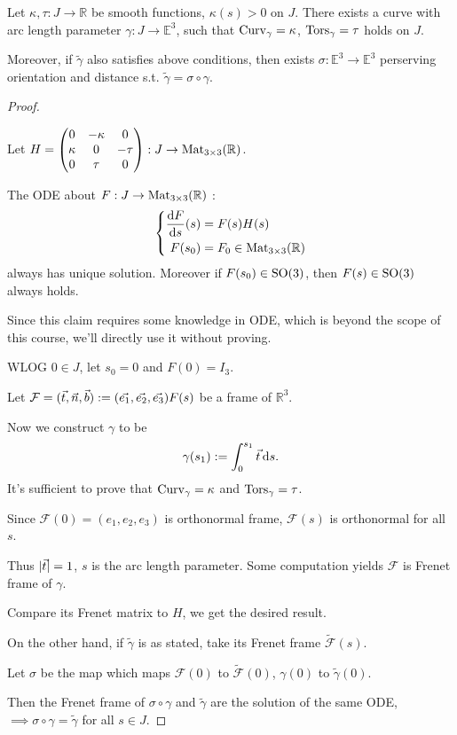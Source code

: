 \begin{theorem}
    Let $\kappa,\tau : J\to \mathbb{R}$ be smooth functions, $\kappa(s)>0$ on $J$.
	There exists a curve with arc length parameter $\gamma: J\to \mathbb{E}^3$,
	such that $\operatorname{Curv}_\gamma = \kappa$, $\operatorname{Tors}_\gamma = \tau$ holds
	on $J$.

	Moreover, if $\tilde \gamma$ also satisfies above conditions,
	then exists $\sigma: \mathbb{E}^3\to \mathbb{E}^3$ perserving orientation and
	distance s.t.  $\tilde\gamma = \sigma\circ\gamma$.
\end{theorem}
\begin{proof}[Proof]
    \begin{claim}
        Let $H = \begin{pmatrix}
			0&-\kappa&0\\\kappa&0&-\tau\\0&\tau&0
        \end{pmatrix}
        : J\to \mathrm{Mat}_{3 \times 3}(\mathbb{R})$.

		The ODE about $F: J\to \mathrm{Mat}_{3 \times 3}(\mathbb{R})$ :
		\[
		\left\{\begin{aligned}
				\frac{\mathop{}\!\mathrm{d} F}{\mathop{}\!\mathrm{d} s}(s) &= F(s)H(s)\\
				F(s_0) &= F_0\in \mathrm{Mat}_{3 \times 3}(\mathbb{R})
		\end{aligned}
		\right.
		\]
		always has unique solution.
		Moreover if $F(s_0)\in \mathrm{SO}(3)$, then $F(s)\in \mathrm{SO}(3)$ always holds.
    \end{claim}

	Since this claim requires some knowledge in ODE, which is beyond the scope of
	this course, we'll directly use it without proving.

	WLOG $0\in J$, let  $s_0=0$ and $F(0)=I_3$.

	Let $\mathcal{F} = (\vec{t},\vec{n},\vec{b}) := (\vec{e_1},\vec{e_2},\vec{e_3})F(s)$
	be a frame of $\mathbb{R}^3$.

	Now we construct $\gamma$ to be
	\[
	\gamma(s_1) := \int_{0}^{s_1} \vec{t}\mathop{}\!\mathrm{d} s.
	\]
	It's sufficient to prove that $\operatorname{Curv}_\gamma=\kappa$ and  $\operatorname{Tors}_\gamma=\tau$.

	Since $\mathcal{F}(0)=(e_1,e_2,e_3)$ is orthonormal frame,
	$\mathcal{F}(s)$ is orthonormal for all $s$.

	Thus  $|\vec{t}| = 1$, $s$ is the arc length parameter.
	Some computation yields $\mathcal{F}$ is Frenet frame of $\gamma$.

	Compare its Frenet matrix to $H$, we get the desired result.

	On the other hand, if  $\tilde\gamma$ is as stated,
	take its Frenet frame $\tilde {\mathcal{F}}(s)$.

	Let $\sigma$ be the map which maps $\mathcal{F}(0)$ to $\tilde {\mathcal{F}}(0)$,
	$\gamma(0)$ to $\tilde\gamma(0)$.

	Then the Frenet frame of $\sigma\circ\gamma$ and  $\tilde\gamma$
	are the solution of the same ODE,
	$\implies \sigma\circ\gamma=\tilde\gamma$ for all $s\in J$.
\end{proof}
